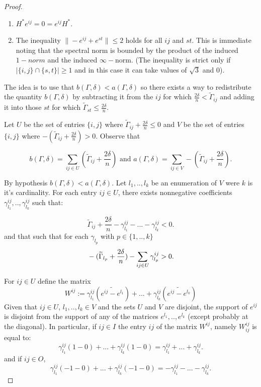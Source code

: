 \documentclass[12pt]{amsart}
\theoremstyle{remark}
\begin{document}
\begin{proof}
\begin{enumerate}
\item  $H^*e^{ij}=0=e^{ij}H^*$. 
\item The inequality $\|-e^{ij}+e^{st}\|\leq 2$ holds for all $ij$ and $st$. This is immediate noting that the spectral norm is bounded by the product of the induced $1-norm$ and the induced $\infty-$norm. (The inequality is strict only if $|\{i,j\}\cap\{s,t\}|\geq 1$ and in this case it can take values of $\sqrt{3}$ and $0$).  
\end{enumerate}

The idea is to use that $b(\Gamma,\delta) < a(\Gamma,\delta)$ so there exists a way to redistribute the quantity $b(\Gamma,\delta)$ by subtracting it from the $ij$ for which $\frac{2\delta}{n}< \widetilde{\Gamma}_{ij}$  and adding it into those $st$ for which $\widetilde{\Gamma}_{st}\leq \frac{2\delta}{n}$.


Let $U$ be the set of entries $\{i,j\}$ where $\widetilde{\Gamma}_{ij}+ \frac{2\delta}{n} \leq 0$ and $V$ be the  set of entries $\{i,j\}$ where $-(\widetilde{\Gamma}_{ij}+ \frac{2\delta}{n}) > 0$.
Observe that 

\[
b(\Gamma,\delta) = \sum_{ij \in U}( \widetilde{\Gamma}_{ij}+ \frac{2\delta}{n}) \text{ and } a(\Gamma,\delta) =  \sum_{ij \in V} -(\widetilde{\Gamma}_{ij} + \frac{2\delta}{n}).
\]

 By hypothesis $b(\Gamma,\delta)< a(\Gamma,\delta)$.
Let $l_1,..,l_k$ be an enumeration of $V$ were $k$ is it's cardinality. For each entry $ij \in U$, there exists nonnegative coefficients $\gamma^{ij}_{l_1},..,\gamma^{ij}_{l_k}$ such that:

\[
 \widetilde{\Gamma}_{ij}+\frac{2\delta}{n}-\gamma^{ij}_{l_1}-...-\gamma^{ij}_{l_k} < 0. 
\]
and that such that for each  $\gamma_{l_p}$ with $p \in \{1,..,k\}$
\begin{equation}{\label{desA}}
-(\widetilde{\Gamma}_{l_p}+\frac{2\delta}{n})-\sum_{ij \in U}\gamma^{ij}_{l_p}>0.
\end{equation}




For $ij \in U$ define the matrix
\[
W^{ij}:= \gamma^{ij}_{l_1}(\widetilde{e^{ij}-e^{l_1}} )+...+\gamma^{ij}_{l_k}(\widetilde{e^{ij}-e^{l_k}})
\]
Given that $ij \in U$, $l_1,..,l_k \in V$ and the sets $U$ and $V$ are disjoint, the support of $e^{ij}$ is disjoint from the support of any of the matrices $e^{l_1},..,e^{l_k}$ (except probably at the diagonal). In particular, if $ij\in I$ the entry $ij$ of the matrix $W^{ij}$, namely $W^{ij}_{ij}$ is equal to:
\[
\gamma^{ij}_{l_1}(1-0)+...+\gamma^{ij}_{l_k}(1-0)= \gamma^{ij}_{l_1}+...+\gamma^{ij}_{l_k}.
\]
and if  $ij\in O$,
\[
\gamma^{ij}_{l_1}(-1-0)+...+\gamma^{ij}_{l_k}(-1-0)= -\gamma^{ij}_{l_1}-...-\gamma^{ij}_{l_k}.
\]


\end{proof}
\end{document}
